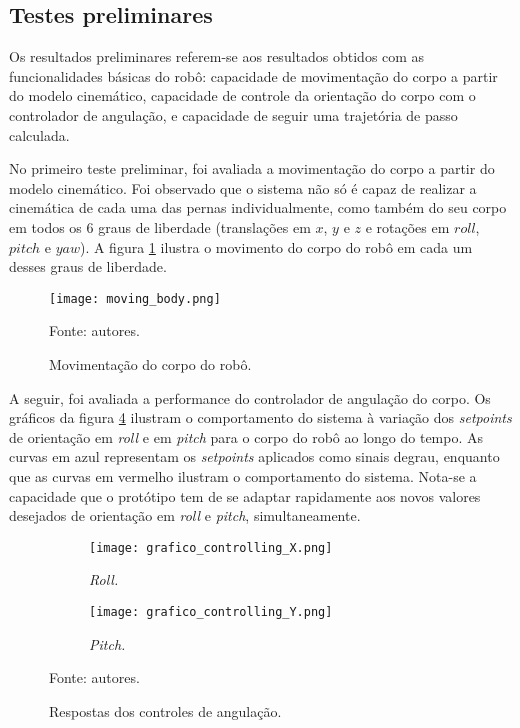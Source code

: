 \documentclass[conference]{IEEEtran}
\begin{document}
  \subsection{Testes preliminares}
  \label{subsec:testes_preliminares}
  
  Os resultados preliminares referem-se aos resultados obtidos com as funcionalidades básicas do robô: capacidade de movimentação do corpo a partir do modelo cinemático, capacidade de controle da orientação do corpo com o controlador de angulação, e capacidade de seguir uma trajetória de passo calculada.

  No primeiro teste preliminar, foi avaliada a movimentação do corpo a partir do modelo cinemático. Foi observado que o sistema não só é capaz de realizar a cinemática de cada uma das pernas individualmente, como também do seu corpo em todos os 6 graus de liberdade (translações em $x$, $y$ e $z$ e rotações em $roll$, $pitch$ e $yaw$). A figura \ref{fig:moving_body} ilustra o movimento do corpo do robô em cada um desses graus de liberdade.
              
  \begin{figure}[!htb]
    \centering
    \texttt{[image: moving\_body.png]}
    \caption{Movimentação do corpo do robô.}
    Fonte: autores.
    \label{fig:moving_body}
  \end{figure}

  A seguir, foi avaliada a performance do controlador de angulação do corpo. Os gráficos da figura \ref{fig:grafico_controlling} ilustram o comportamento do sistema à variação dos \textit{setpoints} de orientação em \textit{roll} e em \textit{pitch} para o corpo do robô ao longo do tempo. As curvas em azul representam os \textit{setpoints} aplicados como sinais degrau, enquanto que as curvas em vermelho ilustram o comportamento do sistema. Nota-se a capacidade que o protótipo tem de se adaptar rapidamente aos novos valores desejados de orientação em \textit{roll} e \textit{pitch}, simultaneamente.

  \begin{figure}
    \centering
    \begin{subfigure}[t]{0.48\textwidth}
      \centering
      \texttt{[image: grafico\_controlling\_X.png]}
      \caption{\textit{Roll.}}
      \label{fig:controlling_roll}
    \end{subfigure}
    \begin{subfigure}[t]{0.48\textwidth}
      \centering
      \texttt{[image: grafico\_controlling\_Y.png]}
      \caption{\textit{Pitch.}}
      \label{fig:controlling_pitch}
    \end{subfigure}
    \caption{Respostas dos controles de angulação.}
    Fonte: autores.
    \label{fig:grafico_controlling}
  \end{figure}
\end{document}
